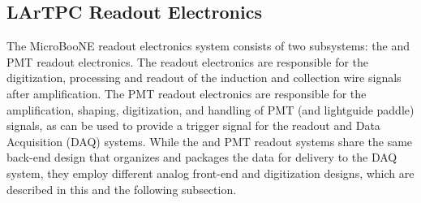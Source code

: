 %
%

\subsection{LArTPC Readout Electronics}
\label{sec:readoutelectronics}
The MicroBooNE readout electronics system consists of two subsystems: the \lartpc and PMT readout electronics. The \lartpc readout electronics are responsible for the digitization, processing and readout of the induction and collection wire signals after amplification. The PMT readout electronics are responsible for the amplification, shaping, digitization, and handling of PMT (and lightguide paddle) signals, as can be used to provide a trigger signal for the readout and Data Acquisition (DAQ) systems. While the \lartpc and PMT readout systems share the same back-end design that organizes and packages the data for delivery to the DAQ system, they employ different analog front-end and digitization designs, which are described in this and the following subsection.


